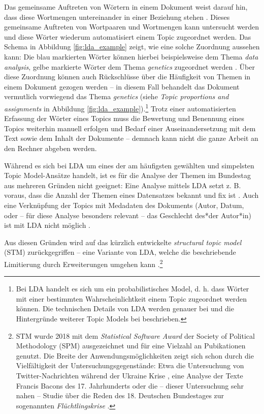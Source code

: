 \documentclass[12pt, 
    twoside=false, 
    bibliography=totoc, 
    numbers=endperiod, 
    headings=normal, 
    toc=chapterentrydotfill
    ]{scrbook}
\begin{document}
Das gemeinsame Auftreten von Wörtern in einem Dokument weist darauf hin, dass diese Wortmengen untereinander in einer Beziehung stehen \parencite[90]{niekler_2018}. Dieses gemeinsame Auftreten von Wortpaaren und Wortmengen kann untersucht werden und diese Wörter wiederum automatisiert einem Topic zugeordnet werden. Das Schema in Abbildung \ref{fig:lda_example} zeigt, wie eine solche Zuordnung aussehen kann: Die blau markierten Wörter können hierbei beispielsweise dem Thema \emph{data analysis}, gelbe markierte Wörter dem Thema \emph{genetics} zugeordnet werden \parencite[vgl.][78]{blei_2012}. Über diese Zuordnung können auch Rückschlüsse über die Häufigkeit von Themen in einem Dokument gezogen werden -- in diesem Fall behandelt das Dokument vermutlich vorwiegend das Thema \emph{genetics} (siehe \emph{Topic proportions and assignments} in Abbildung \ref{fig:lda_example}).\footnote{Bei LDA handelt es sich um ein probabilistisches Model, d. h. dass Wörter mit einer bestimmten Wahrscheinlichtkeit einem Topic zugeordnet werden können. Die technischen Details von LDA werden genauer bei \textcite{blei_2012} und die Hintergründe weiterer Topic Models bei \textcite[87ff.]{niekler_2018} beschrieben.} Trotz einer automatisierten Erfassung der Wörter eines Topics muss die Bewertung und Benennung eines Topics weiterhin manuell erfolgen und Bedarf einer Auseinandersetzung mit dem Text sowie dem Inhalt der Dokumente -- demnach kann nicht die ganze Arbeit an den Rechner abgeben werden.

Während es sich bei LDA um eines der am häufigsten gewählten und simpelsten Topic Model-Ansätze handelt, ist es für die Analyse der Themen im Bundestag aus mehreren Gründen nicht geeignet:
Eine Analyse mittels LDA setzt z. B. voraus, dass die Anzahl der Themen eines Datensatzes bekannt und fix ist \parencites[93]{niekler_2018}[82f.]{blei_2012}. Auch eine Verknüpfung der Topics mit Medadaten des Dokuments (Autor, Datum, oder -- für diese Analyse besonders relevant -- das Geschlecht des*der Autor*in) ist mit LDA nicht möglich \parencites[94]{niekler_2018}[82f.]{blei_2012}. 

Aus diesen Gründen wird auf das kürzlich entwickelte \emph{structural topic model} (STM) zurückgegriffen -- eine Variante von LDA, welche die beschriebende Limitierung durch Erweiterungen umgehen kann \parencite[640]{mishler_2015}.\footnote{STM wurde 2018 mit dem \emph{Statistical Software Award} der {Society of Political Methodology} (SPM) ausgezeichnet und für eine Vielzahl an Pubikationen genutzt. Die Breite der Anwendungsmöglichkeiten zeigt sich schon durch die Vielfältigkeit der Untersuchungsgegenstände: Etwa die Untersuchung von Twitter-Nachrichten während der Ukraine Krise \parencite{mishler_2015}, eine Analyse der Texte Francis Bacons des 17. Jahrhunderts \parencite{grajzl_2019} oder die -- dieser Untersuchung sehr nahen -- Studie über die Reden des 18. Deutschen Bundestages zur sogenannten \emph{Flüchtlingskrise} \parencite{geese_2019}.}
\end{document}
